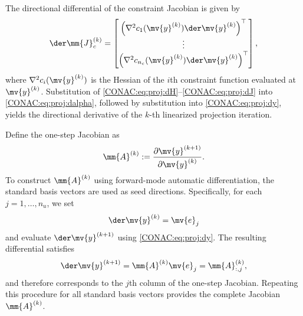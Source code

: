 The directional differential of the constraint Jacobian is given by
\begin{equation}
  \label{CONAC:eq:proj:dJ}
  \der\mm{J}_c^{(k)}
  =
  \begin{bmatrix}
    \left(
      \nabla^2 c_1(\mv{y}^{(k)})
      \der\mv{y}^{(k)}
    \right)^{\top}
    \\
    \vdots
    \\
    \left(
      \nabla^2 c_{n_c}(\mv{y}^{(k)})
      \der\mv{y}^{(k)}
    \right)^{\top}
  \end{bmatrix},
\end{equation}
where $\nabla^2 c_i(\mv{y}^{(k)})$ is the Hessian of the $i$th constraint function evaluated at $\mv{y}^{(k)}$.
Substitution of \eqref{CONAC:eq:proj:dH}--\eqref{CONAC:eq:proj:dJ} into \eqref{CONAC:eq:proj:dalpha}, followed by substitution into \eqref{CONAC:eq:proj:dy}, yields the directional derivative of the $k$-th linearized projection iteration.

Define the one-step Jacobian as
\begin{equation}
  \label{CONAC:eq:proj:Ak}
  \mm{A}^{(k)}
  :=
  \frac{
    \partial\mv{y}^{(k+1)}
  }{
    \partial\mv{y}^{(k)}
  }
  .
\end{equation}
To construct $\mm{A}^{(k)}$ using forward-mode automatic differentiation, the standard basis vectors are used as seed directions.
Specifically, for each $j=1,\ldots,n_u$, we set
\begin{equation}
  \der\mv{y}^{(k)}=\mv{e}_j
\end{equation}
and evaluate $\der\mv{y}^{(k+1)}$ using \eqref{CONAC:eq:proj:dy}. 
The resulting differential satisfies
\begin{equation}
  \der\mv{y}^{(k+1)}
  =
  \mm{A}^{(k)}\mv{e}_j
  =
  \mm{A}^{(k)}_{:,j}
  ,
\end{equation}
and therefore corresponds to the $j$th column of the one-step Jacobian. 
Repeating this procedure for all standard basis vectors provides the complete Jacobian $\mm{A}^{(k)}$.

